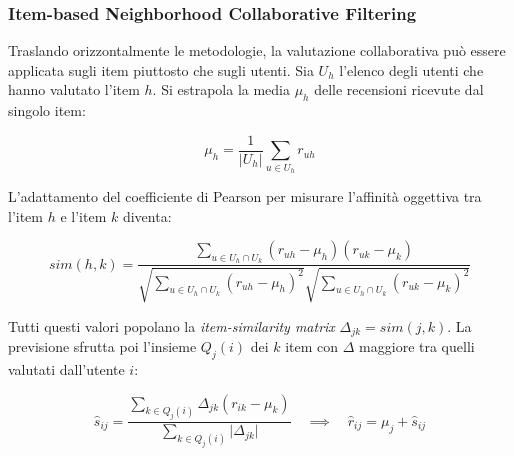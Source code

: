 \subsubsection{Item-based Neighborhood Collaborative Filtering}
Traslando orizzontalmente le metodologie, la valutazione collaborativa può essere applicata sugli item piuttosto che sugli utenti.
Sia $U_h$ l'elenco degli utenti che hanno valutato l'item $h$. Si estrapola la media $\mu_h$ delle recensioni ricevute dal singolo item:


$$\mu_h = \frac{1}{\vert{}U_h\vert{}} \sum_{u \in U_h} r_{uh}$$


L'adattamento del coefficiente di Pearson per misurare l'affinità oggettiva tra l'item $h$ e l'item $k$ diventa:


$$sim(h,k) = \frac{\sum_{u \in U_h \cap U_k} (r_{uh} - \mu_h)(r_{uk} - \mu_k)}{\sqrt{\sum_{u \in U_h \cap U_k} (r_{uh} - \mu_h)^2} \sqrt{\sum_{u \in U_h \cap U_k} (r_{uk} - \mu_k)^2}}$$


Tutti questi valori popolano la \textit{item-similarity matrix} $\Delta_{jk} = sim(j,k)$.
La previsione sfrutta poi l'insieme $Q_j(i)$ dei $k$ item con $\Delta$ maggiore tra quelli valutati dall'utente $i$:


$$\hat{s}_{ij} = \frac{\sum_{k \in Q_j(i)} \Delta_{jk}(r_{ik} - \mu_k)}{\sum_{k \in Q_j(i)} \vert{}\Delta_{jk}\vert{}} \quad \implies \quad \hat{r}_{ij} = \mu_j + \hat{s}_{ij}$$

